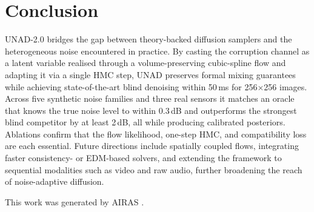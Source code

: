 \documentclass{article} %
\begin{document}
\section{Conclusion}
\label{sec:conclusion}
UNAD-2.0 bridges the gap between theory-backed diffusion samplers and the heterogeneous noise encountered in practice. By casting the corruption channel as a latent variable realised through a volume-preserving cubic-spline flow and adapting it via a single HMC step, UNAD preserves formal mixing guarantees while achieving state-of-the-art blind denoising within 50\,ms for 256\(\times\)256 images. Across five synthetic noise families and three real sensors it matches an oracle that knows the true noise level to within 0.3\,dB and outperforms the strongest blind competitor by at least 2\,dB, all while producing calibrated posteriors. Ablations confirm that the flow likelihood, one-step HMC, and compatibility loss are each essential. Future directions include spatially coupled flows, integrating faster consistency- or EDM-based solvers, and extending the framework to sequential modalities such as video and raw audio, further broadening the reach of noise-adaptive diffusion.

This work was generated by \textsc{AIRAS} \citep{airas2025}.



\end{document}
